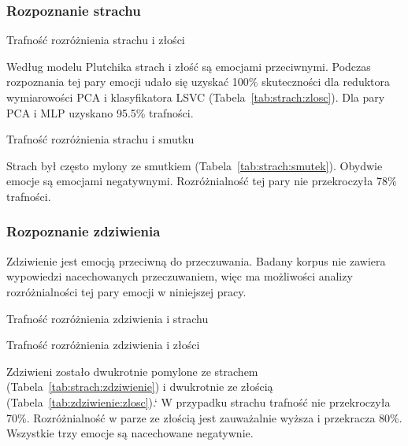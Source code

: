 \documentclass[a4paper,12pt,twoside,openany]{report}
\newcommand{\Tab}[1]{(Tabela~\ref{#1})}
\begin{document}
\subsubsection{Rozpoznanie strachu}
\begin{table}[hc!]
	\caption{Trafność rozróżnienia strachu i złości}
	\centering
	
	\label{tab:strach:zlosc}
\end{table}
Według modelu Plutchika strach i złość są emocjami przeciwnymi. 
Podczas rozpoznania tej pary emocji udało się uzyskać 100\% skuteczności dla reduktora wymiarowości PCA i klasyfikatora LSVC \Tab{tab:strach:zlosc}.
Dla pary PCA i MLP uzyskano 95.5\% trafności.

\begin{table}[hc!]
	\caption{Trafność rozróżnienia strachu i smutku}
	\centering
	
	\label{tab:strach:smutek}
\end{table}
Strach był często mylony ze smutkiem \Tab{tab:strach:smutek}. 
Obydwie emocje są emocjami negatywnymi. 
Rozróżnialność tej pary nie przekroczyła 78\% trafności.

\subsubsection{Rozpoznanie zdziwienia}
Zdziwienie jest emocją przeciwną do przeczuwania.
Badany korpus nie zawiera wypowiedzi nacechowanych przeczuwaniem, więc ma możliwości analizy rozróżnialności tej pary emocji w niniejszej pracy.
\begin{table}[hc!]
	\caption{Trafność rozróżnienia zdziwienia i strachu}
	\centering
	
	\label{tab:strach:zdziwienie}
\end{table}
\begin{table}[hc!]
	\caption{Trafność rozróżnienia zdziwienia i złości}
	\centering
	
	\label{tab:zdziwienie:zlosc}
\end{table}
Zdziwieni zostało dwukrotnie pomylone ze strachem \Tab{tab:strach:zdziwienie} i dwukrotnie ze złością \Tab{tab:zdziwienie:zlosc}.`
W przypadku strachu trafność nie przekroczyła 70\%. 
Rozróżnialność w parze ze złością jest zauważalnie wyższa i przekracza 80\%.
Wszystkie trzy emocje są nacechowane negatywnie.
\end{document}
